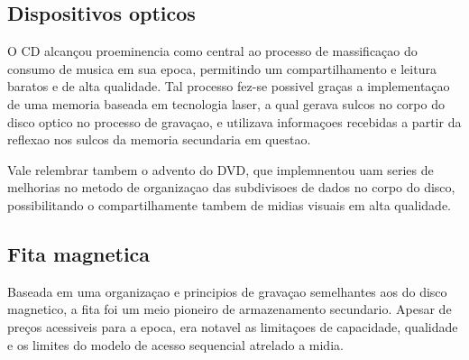 \documentclass[12pt]{article}
\begin{document}
\subsection{Dispositivos opticos}
O CD alcançou proeminencia como central ao processo de massificaçao do consumo de musica em sua epoca, permitindo um compartilhamento e leitura baratos e de alta qualidade. Tal processo fez-se possivel graças a implementaçao de uma memoria baseada em tecnologia laser, a qual gerava sulcos no corpo do disco optico no processo de gravaçao, e utilizava informaçoes recebidas a partir da reflexao nos sulcos da memoria secundaria em questao.

Vale relembrar tambem o advento do DVD, que implemnentou uam series de melhorias no metodo de organizaçao das subdivisoes de dados no corpo do disco, possibilitando o compartilhamente tambem de midias visuais em alta qualidade.
\subsection{Fita magnetica}
Baseada em uma organizaçao e principios de gravaçao semelhantes aos do disco magnetico, a fita foi um meio pioneiro de armazenamento secundario. Apesar de preços acessiveis para a epoca, era notavel as limitaçoes de capacidade, qualidade e os limites do modelo de acesso sequencial atrelado a midia.
\end{document}
